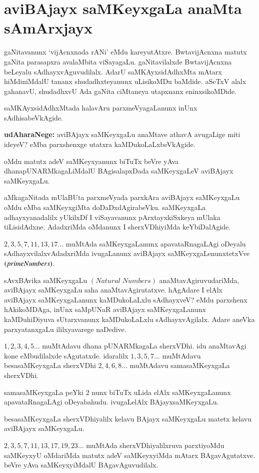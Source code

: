 \chapter{aviBAjayx saMKeyxgaLa anaMta sAmArxjayx}

gaNitavanunx `vijAcnxnada rANi' eMdu kareyutAtxre. BwtavijAcnxna matutx gaNita \-parasapxra avalaMbita viSayagaLu. gaNitavilalxde BwtavijAcnxna beLeyalu sAdhayxvAguvudilalx. AdarU saMKAyxsidAdhxMta mAtarx hiMdiniMdalU tananx shudadhxteyanunx uLisikoMDu baMdide. aSeTxV alalx gahanavU, shudadhxvU Ada gaNita ciMtaneya utapxnanx eninxsikoMDide.

saMKAyxsidAdhxMtada halavAru parxmeVyagaLanunx inUnx sAdhisabeVkAgide. 

\textbf{udAharaNege:} aviBAjayx saMKeyxgaLu anaMtave athavA avugaLige miti ideyeV? eMba parxshenxge utatxra kaMDukoLaLxbeVkAgide. 

oMdu matutx adeV saMKeyxyanunx biTuTx beVre yAva dhanapUNARMkagaLiMdalU BAgisalapxDada saMKeyxgaLeV aviBAjayx saMKeyxgaLu.

aMkagaNitada mUlaBUta parxmeVyada parxkAra aviBAjayx saMKeyxgaLu oMdu eMba saMKeyxgiMta doDaDxdAgirabeVku. saMKeyxgaLa adhayxyanadalilx yUkilxDf I viSayavanunx pArxtayxkiSxkeya mUlaka tiLisidAdxne. AdadxriMda oMdanunx I sherxVDhiyiMda keYbiDalAgide.
 
$2,3,5,7,11,13,17\ldots$ muMtAda saMKeyxgaLanunx apavataRnagaLAgi oDe\break yalu sAdhayxvilalxvAdadxriMda ivugaLanunx aviBAjayx saMKeyxgaLenunxtetxVve $(prime\- Numbers)$.

sAvxBAvika saMKeyxgaLu $(Natural\; Numbers)$ anaMtavAgiruvudariMda, avi\-BAjayx saMKeyxgaLu saha anaMtavAgirutatxve. hAgAdare I elAlx aviBAjayx saMKeyxgaLanunx kaMDukoLaLxlu sAdhayxveV? eMdu parxshenx hAkikoMDAga, inUnx saMpUNaR aviBAjayx saMKeyxgaLanunx kaMDuhiDiyuva sUtarxvanunx kaMDukoLaLxlu sAdhayxvAgilalx. Adare aneVka parxyatanxgaLu ililxyavarege naDedive.

$1,2,3,4,5\ldots$ muMtAdavu dhana pUNARMkagaLa sherxVDhi. idu anaMtavAgi kone eMbudilalxde sAgutatxde. idaralilx $1,3,5,7\ldots$ muMtAdavu besasaMKeyxgaLa sherxVDhi $2,4,6,8\ldots$ muMtAdavu samasaMKeyxgaLa sherxVDhi.

samasaMKeyxgaLa peYki $2$ nunx biTuTx uLida elAlx saMKeyxgaLanunx apavataRnagaLAgi oDeyabahudu. ivugaLelAlx BAjayxsaMKeyxgaLu.

besasaMKeyxgaLa sherxVDhiyalilx kelavu BAjayx saMKeyxgaLu matetx kelavu aviBAjayx saMKeyx\-gaLu.

$2,3,5,7,11,13,17,19,23\ldots$ muMtAda sherxVDhiyalilxruva parxtiyoMdu saMKeyxyU oMdariMda matutx adeV saMKeyxyiMda mAtarx BAgavAgutatxve. beVre yAva saMKeyxyiMdalU BAgavAguvudilalx.

